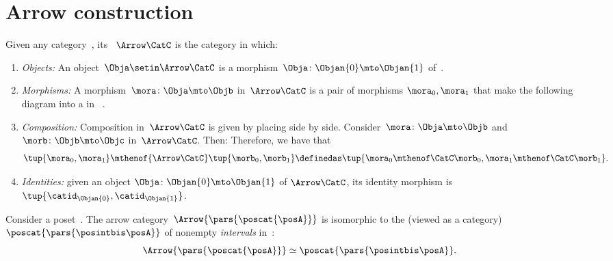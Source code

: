 
\section{Arrow construction}


\begin{ctdefinition}
    \label{def:arrow-category}
    Given any category~\CatC, its ~$\Arrow\CatC$ is the category in which:
    \begin{enumerate}
        \item \emph{Objects:} An object~$\Obja \setin \Arrow\CatC$ is a morphism~$\Obja\colon \Objan{0}\mto \Objan{1}$ of~\CatC.
        \item \emph{Morphisms:} A morphism~$\mora\colon \Obja \mto \Objb$ in~$\Arrow\CatC$ is a pair of morphisms $\mora_0,\mora_1$ that make the following diagram into a  in~\CatC
              .
        \item \emph{Composition:} Composition in~$\Arrow \CatC$ is given by placing  side by side.
              Consider~$\mora\colon \Obja \mto \Objb$ and~$\morb\colon \Objb \mto \Objc$ in~$\Arrow\CatC$.
              Then:
              Therefore, we have that
              \begin{equation}\label{eq:arrow-cat-composition}
                  \tup{\mora_0,\mora_1} \mthenof{\Arrow \CatC} \tup{\morb_0,\morb_1}
                  \definedas \tup{\mora_0\mthenof\CatC\morb_0, \mora_1\mthenof\CatC\morb_1
                  }.
              \end{equation}
    \item \emph{Identities:} given an object $\Obja\colon \Objan{0}\mto \Objan{1}$ of $\Arrow\CatC$, its identity morphism is $\tup{\catid_{\Objan{0}},\catid_{\Objan{1}}}$.
    \end{enumerate}
\end{ctdefinition}

\begin{example}[Intervals]
    \label{exa:arrow-poset}
    Consider a poset~\posA.
    The arrow category~$\Arrow{\pars{\poscat{\posA}}}$ is isomorphic to the  (viewed as a category)~$\poscat{\pars{\posintbis\posA}}$ of nonempty \emph{intervals} in~\posA:
    \begin{equation}
        \Arrow{\pars{\poscat{\posA}}} \simeq
        \poscat{\pars{\posintbis\posA}}.
    \end{equation}
\end{example}

